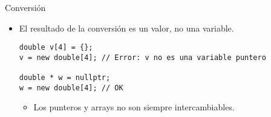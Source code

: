 \begin{frame}[t,fragile]{Conversión}
\begin{itemize}
  \item El resultado de la conversión es un valor, no una variable.
\begin{lstlisting}
double v[4] = {};
v = new double[4]; // Error: v no es una variable puntero

double * w = nullptr;
w = new double[4]; // OK
\end{lstlisting}
    \begin{itemize}
      \item Los punteros y arrays no son siempre intercambiables.
    \end{itemize}
\end{itemize}
\end{frame}
